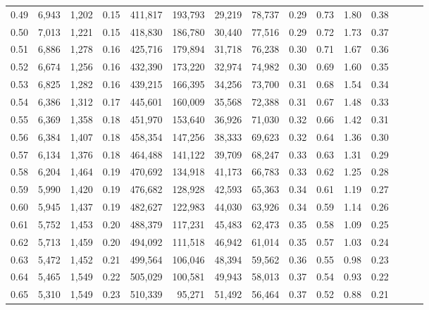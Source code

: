 \begin{tabular}{rrrrrrrrrrrrrrr}
0.49 &   6,943 &  1,202 &  0.15 &  411,817 &  193,793 &   29,219 &   78,737 &  0.29 &  0.73 &  1.80 &      0.38 \\
0.50 &   7,013 &  1,221 &  0.15 &  418,830 &  186,780 &   30,440 &   77,516 &  0.29 &  0.72 &  1.73 &      0.37 \\
0.51 &   6,886 &  1,278 &  0.16 &  425,716 &  179,894 &   31,718 &   76,238 &  0.30 &  0.71 &  1.67 &      0.36 \\
0.52 &   6,674 &  1,256 &  0.16 &  432,390 &  173,220 &   32,974 &   74,982 &  0.30 &  0.69 &  1.60 &      0.35 \\
0.53 &   6,825 &  1,282 &  0.16 &  439,215 &  166,395 &   34,256 &   73,700 &  0.31 &  0.68 &  1.54 &      0.34 \\
0.54 &   6,386 &  1,312 &  0.17 &  445,601 &  160,009 &   35,568 &   72,388 &  0.31 &  0.67 &  1.48 &      0.33 \\
0.55 &   6,369 &  1,358 &  0.18 &  451,970 &  153,640 &   36,926 &   71,030 &  0.32 &  0.66 &  1.42 &      0.31 \\
0.56 &   6,384 &  1,407 &  0.18 &  458,354 &  147,256 &   38,333 &   69,623 &  0.32 &  0.64 &  1.36 &      0.30 \\
0.57 &   6,134 &  1,376 &  0.18 &  464,488 &  141,122 &   39,709 &   68,247 &  0.33 &  0.63 &  1.31 &      0.29 \\
0.58 &   6,204 &  1,464 &  0.19 &  470,692 &  134,918 &   41,173 &   66,783 &  0.33 &  0.62 &  1.25 &      0.28 \\
0.59 &   5,990 &  1,420 &  0.19 &  476,682 &  128,928 &   42,593 &   65,363 &  0.34 &  0.61 &  1.19 &      0.27 \\
0.60 &   5,945 &  1,437 &  0.19 &  482,627 &  122,983 &   44,030 &   63,926 &  0.34 &  0.59 &  1.14 &      0.26 \\
0.61 &   5,752 &  1,453 &  0.20 &  488,379 &  117,231 &   45,483 &   62,473 &  0.35 &  0.58 &  1.09 &      0.25 \\
0.62 &   5,713 &  1,459 &  0.20 &  494,092 &  111,518 &   46,942 &   61,014 &  0.35 &  0.57 &  1.03 &      0.24 \\
0.63 &   5,472 &  1,452 &  0.21 &  499,564 &  106,046 &   48,394 &   59,562 &  0.36 &  0.55 &  0.98 &      0.23 \\
0.64 &   5,465 &  1,549 &  0.22 &  505,029 &  100,581 &   49,943 &   58,013 &  0.37 &  0.54 &  0.93 &      0.22 \\
0.65 &   5,310 &  1,549 &  0.23 &  510,339 &   95,271 &   51,492 &   56,464 &  0.37 &  0.52 &  0.88 &      0.21 \\

\end{tabular}
